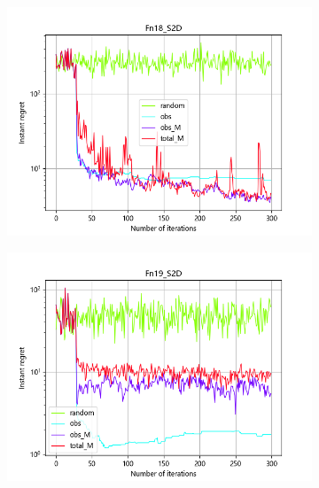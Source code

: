 \documentclass{article}
\begin{document}
\begin{figure}[H]
\begin{subfigure}[t]{.32\linewidth}
        \includegraphics[width=1\textwidth]{pictures/Homo_noise_2D/S/Fn18_S2D_ins.png}
    \end{subfigure}
    \begin{subfigure}[t]{.32\linewidth}
        \centering
        \includegraphics[width=1\textwidth]{pictures/Homo_noise_2D/S/Fn19_S2D_ins.png}
    \end{subfigure}
    \begin{subfigure}[t]{.32\linewidth}
        \centering

\end{subfigure}
\end{figure}
\end{document}
